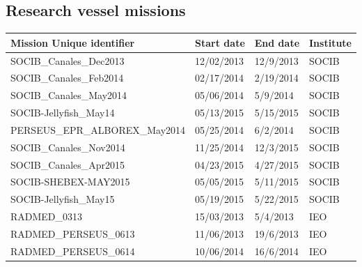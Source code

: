 \documentclass[10pt,landscape]{article}
\begin{document}
\begin{multicols}{2}
\subsection*{Research vessel missions}
\begin{table}[H]
\begin{tabular}{llll}
\toprule
Mission Unique identifier	& Start date			& End date			& Institute \\
\midrule
SOCIB\_Canales\_Dec2013		& 	12/02/2013 		& 12/9/2013 	& SOCIB	\\
SOCIB\_Canales\_Feb2014		& 	02/17/2014 		& 2/19/2014 	& SOCIB	\\
SOCIB\_Canales\_May2014		& 	05/06/2014 		& 5/9/2014 	& SOCIB	\\
SOCIB-Jellyfish\_May14		& 	05/13/2015 		& 5/15/2015	& SOCIB	\\	
PERSEUS\_EPR\_ALBOREX\_May2014	& 05/25/2014 	& 6/2/2014 	& SOCIB	\\
SOCIB\_Canales\_Nov2014		& 	11/25/2014 		& 12/3/2015 	& SOCIB	\\
SOCIB\_Canales\_Apr2015		& 	04/23/2015 		& 4/27/2015 	& SOCIB	\\
SOCIB-SHEBEX-MAY2015			& 	05/05/2015 		& 5/11/2015	& SOCIB	\\
SOCIB-Jellyfish\_May15		& 	05/19/2015 		& 5/22/2015 	& SOCIB	\\		
\midrule
RADMED\_0313					& 	15/03/2013		& 5/4/2013	& IEO \\
RADMED\_PERSEUS\_0613		& 	11/06/2013		& 19/6/2013	& IEO \\
RADMED\_PERSEUS\_0614		& 	10/06/2014		& 16/6/2014	& IEO \\
\bottomrule
\end{tabular}
\end{table}

\end{multicols}
\end{document}
